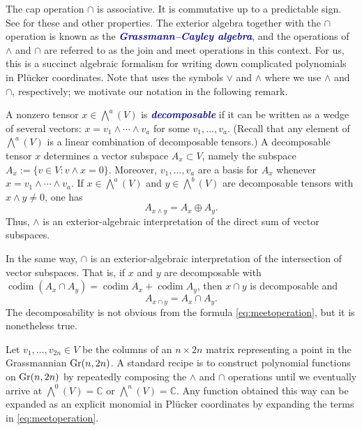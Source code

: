 \documentclass[ALCO, Unicode]{cedram}
\numberwithin{equation}{section}
\DeclareMathOperator{\codim}{\mathrm{codim}}
\newcommand{\newword}[1]{\textcolor{darkblue}{\textbf{\emph{#1}}}}
\begin{document}
The cap operation $\cap$ is associative. It is commutative up to a predictable sign. See \cite[Chapter~3]{Sturmfels} for these and other properties. The exterior algebra together with the $\cap$ operation is known as the \newword{Grassmann--Cayley algebra}, and the operations of $\wedge$ and $\cap$ are referred to as the join and meet operations in this context. For us, this is a succinct algebraic formalism for writing down complicated polynomials in Pl\"ucker coordinates. Note that \cite{Sturmfels} uses the symbols $\vee$ and $\wedge$ where we use $\wedge$ and $\cap$, respectively; we motivate our notation in the following remark.

\begin{remark} 
A nonzero tensor $x \in \bigwedge^a(V)$ is \newword{decomposable} if it can be written as a wedge of several vectors: $x = v_1 \wedge \cdots \wedge v_a$ for some $v_1,\dots,v_a$. (Recall that any element of $\bigwedge^a(V)$ is a linear combination of decomposable tensors.) A decomposable tensor $x$ determines a vector subspace $A_x \subset V$, namely the subspace $A_x := \{v \in V \colon v \wedge x = 0\}$. Moreover, $v_1,\dots,v_a$ are a basis for $A_x$ whenever $x = v_1 \wedge \cdots \wedge v_a$. If $x \in \bigwedge^a(V)$ and $y \in \bigwedge^b(V)$ are decomposable tensors with $x \wedge y \neq 0$, one has 
$$A_{x \wedge y} = A_x \oplus A_y.$$
Thus, $\wedge$ is an exterior-algebraic interpretation of the direct sum of vector subspaces. 

In the same way, $\cap$ is an exterior-algebraic interpretation of the intersection of vector subspaces. That is, if $x$ and $y$ are decomposable with $\codim(A_x \cap A_y) = \codim A_x + \codim A_y$, then $x \cap y$ is decomposable and 
\[A_{x \cap y} = A_x \cap A_y.\]
The decomposability is not obvious from the formula \eqref{eq:meetoperation}, but it is nonetheless true. 
\end{remark}
 

\begin{remark}\label{rmk:cookingwithGC}
Let $v_1,\dots,v_{2n} \in V$ be the columns of an $n \times 2n$ matrix representing a point in the Grassmannian ${\rm Gr}(n,2n)$. A standard recipe is to construct polynomial functions on ${\rm Gr}(n,2n)$ by repeatedly composing the $\wedge$ and $\cap$ operations until we eventually arrive at $\bigwedge^0(V) = \mathbb{C}$ or $\bigwedge^n(V) = \mathbb{C}$. Any function obtained this way can be expanded as an explicit monomial in Pl\"ucker coordinates by expanding the terms in \eqref{eq:meetoperation}.
\end{remark}
\end{document}
